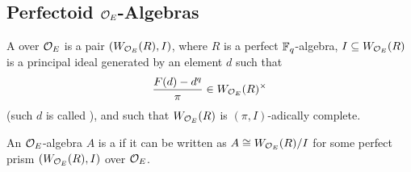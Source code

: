\subsection{Perfectoid \texorpdfstring{$\mathcal{O}_E$}{O}-Algebras}
\begin{defi}
	\begin{numerate}
		\item A  over $\mathcal{O}_E$ is a pair $(W_{\mathcal{O}_E}(R),I)$, where $R$ is a perfect $\mathbb{F}_q$-algebra, $I\subseteq W_{\mathcal{O}_E}(R)$ is a principal ideal generated by an element $d$ such that
		\begin{equation*}
			\frac{F(d)-d^q}{\pi}\in W_{\mathcal{O}_E}(R)^\times
		\end{equation*}
		(such $d$ is called ), and such that $W_{\mathcal{O}_E}(R)$ is $(\pi,I)$-adically complete.
		\item An $\mathcal{O}_E$-algebra $A$ is a  if it can be written as $A\cong W_{\mathcal{O}_E}(R)/I$ for some perfect prism $(W_{\mathcal{O}_E}(R),I)$ over $\mathcal{O}_E$.
	\end{numerate}
\end{defi}
